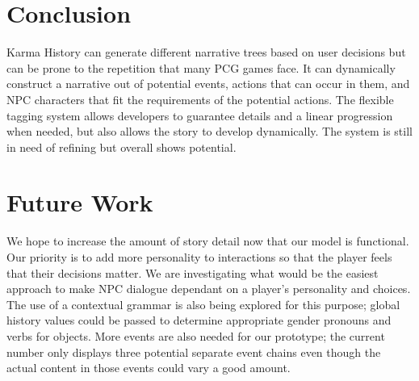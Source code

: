 \section{Conclusion} \label{Conclusion}
Karma History can generate different narrative trees based on user decisions but can be prone to the repetition that many PCG games face. It can dynamically construct a narrative out of potential events, actions that can occur in them, and NPC characters that fit the requirements of the potential actions. The flexible tagging system allows developers to guarantee details and a linear progression when needed, but also allows the story to develop dynamically. The system is still in need of refining but overall shows potential.

\section{Future Work}
We hope to increase the amount of story detail now that our model is functional. Our priority is to add more personality to interactions so that the player feels that their decisions matter. We are investigating what would be the easiest approach to make NPC dialogue dependant on a player's personality and choices. The use of a contextual grammar is also being explored for this purpose; global history values could be passed to determine appropriate gender pronouns and verbs for objects. More events are also needed for our prototype; the current number only displays three potential separate event chains even though the actual content in those events could vary a good amount.
